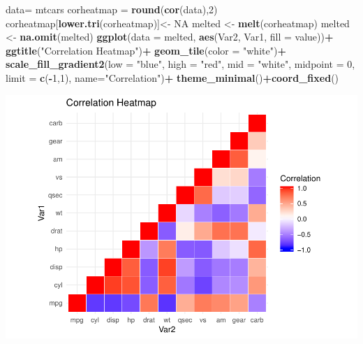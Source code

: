 \documentclass[]{article}
\newenvironment{Shaded}{\begin{snugshade}}{\end{snugshade}}
\newcommand{\DataTypeTok}[1]{\textcolor[rgb]{0.13,0.29,0.53}{#1}}
\newcommand{\DecValTok}[1]{\textcolor[rgb]{0.00,0.00,0.81}{#1}}
\newcommand{\KeywordTok}[1]{\textcolor[rgb]{0.13,0.29,0.53}{\textbf{#1}}}
\newcommand{\NormalTok}[1]{#1}
\newcommand{\OperatorTok}[1]{\textcolor[rgb]{0.81,0.36,0.00}{\textbf{#1}}}
\newcommand{\OtherTok}[1]{\textcolor[rgb]{0.56,0.35,0.01}{#1}}
\newcommand{\StringTok}[1]{\textcolor[rgb]{0.31,0.60,0.02}{#1}}
\begin{document}
\begin{Shaded}
\begin{Highlighting}[]
\NormalTok{data=}\StringTok{ }\NormalTok{mtcars}
\NormalTok{corheatmap =}\StringTok{ }\KeywordTok{round}\NormalTok{(}\KeywordTok{cor}\NormalTok{(data),}\DecValTok{2}\NormalTok{)}
\NormalTok{corheatmap[}\KeywordTok{lower.tri}\NormalTok{(corheatmap)]\textless{}{-}}\StringTok{ }\OtherTok{NA}
\NormalTok{melted \textless{}{-}}\StringTok{ }\KeywordTok{melt}\NormalTok{(corheatmap)}
\NormalTok{melted \textless{}{-}}\StringTok{ }\KeywordTok{na.omit}\NormalTok{(melted)}
\KeywordTok{ggplot}\NormalTok{(}\DataTypeTok{data =}\NormalTok{ melted, }\KeywordTok{aes}\NormalTok{(Var2, Var1, }\DataTypeTok{fill =}\NormalTok{ value))}\OperatorTok{+}
\KeywordTok{ggtitle}\NormalTok{(}\StringTok{"Correlation Heatmap"}\NormalTok{)}\OperatorTok{+}
\KeywordTok{geom\_tile}\NormalTok{(}\DataTypeTok{color =} \StringTok{"white"}\NormalTok{)}\OperatorTok{+}
\KeywordTok{scale\_fill\_gradient2}\NormalTok{(}\DataTypeTok{low =} \StringTok{"blue"}\NormalTok{,}
\DataTypeTok{high =} \StringTok{"red"}\NormalTok{, }\DataTypeTok{mid =} \StringTok{"white"}\NormalTok{,}
\DataTypeTok{midpoint =} \DecValTok{0}\NormalTok{, }\DataTypeTok{limit =} \KeywordTok{c}\NormalTok{(}\OperatorTok{{-}}\DecValTok{1}\NormalTok{,}\DecValTok{1}\NormalTok{), }\DataTypeTok{name=}\StringTok{"Correlation"}\NormalTok{)}\OperatorTok{+}
\KeywordTok{theme\_minimal}\NormalTok{()}\OperatorTok{+}\KeywordTok{coord\_fixed}\NormalTok{()}
\end{Highlighting}
\end{Shaded}

\includegraphics{Motor_Trend_Data_Analysis_Final_Project_files/figure-latex/unnamed-chunk-11-1.pdf}
\end{document}
